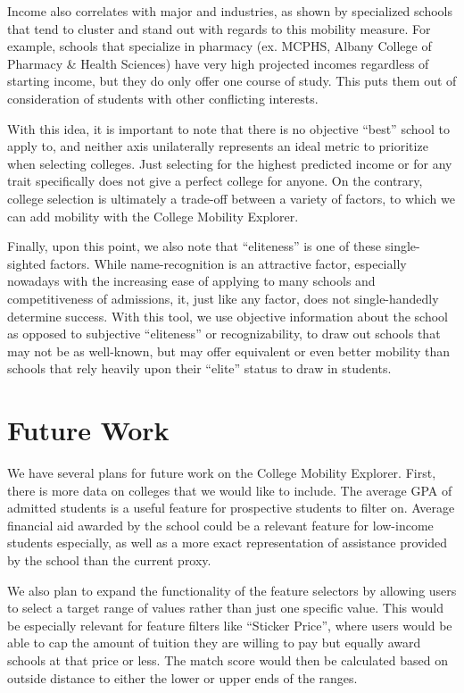 \documentclass{vgtc}
\begin{document}
Income also correlates with major and industries, as shown by specialized schools that tend to cluster and stand out with regards to this mobility measure. For example, schools that specialize in pharmacy (ex. MCPHS, Albany College of Pharmacy \& Health Sciences) have very high projected incomes regardless of starting income, but they do only offer one course of study. This puts them out of consideration of students with other conflicting interests.

With this idea, it is important to note that there is no objective ``best'' school to apply to, and neither axis unilaterally represents an ideal metric to prioritize when selecting colleges. Just selecting for the highest predicted income or for any trait specifically does not give a perfect college for anyone. On the contrary, college selection is ultimately a trade-off between a variety of factors, to which we can add mobility with the College Mobility Explorer.

Finally, upon this point, we also note that ``eliteness'' is one of these single-sighted factors. While name-recognition is an attractive factor, especially nowadays with the increasing ease of applying to many schools and competitiveness of admissions, it, just like any factor, does not single-handedly determine success. With this tool, we use objective information about the school as opposed to subjective ``eliteness'' or recognizability, to draw out schools that may not be as well-known, but may offer equivalent or even better mobility than schools that rely heavily upon their ``elite'' status to draw in students.

\section{Future Work}
We have several plans for future work on the College Mobility Explorer. First, there is more data on colleges that we would like to include. The average GPA of admitted students is a useful feature for prospective students to filter on. Average financial aid awarded by the school could be a relevant feature for low-income students especially, as well as a more exact representation of assistance provided by the school than the current proxy.

We also plan to expand the functionality of the feature selectors by allowing users to select a target range of values rather than just one specific value. This would be especially relevant for feature filters like “Sticker Price”, where users would be able to cap the amount of tuition they are willing to pay but equally award schools at that price or less. The match score would then be calculated based on outside distance to either the lower or upper ends of the ranges.
\end{document}
